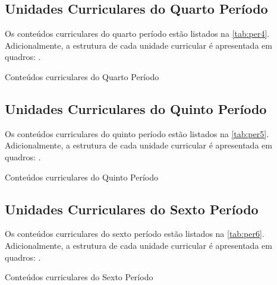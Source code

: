 \clearpage

\subsection{Unidades Curriculares do Quarto Período}

Os conteúdos curriculares do quarto período estão listados na \autoref{tab:per4}. Adicionalmente, a estrutura de cada unidade curricular é apresentada em quadros: .

\begin{table}[!htb]
	\centering\footnotesize
	\caption{Conteúdos curriculares do Quarto Período}
	\label{tab:per4}
\end{table}

\clearpage

\subsection{Unidades Curriculares do Quinto Período}

Os conteúdos curriculares do quinto período estão listados na \autoref{tab:per5}. Adicionalmente, a estrutura de cada unidade curricular é apresentada em quadros: .

\begin{table}[!htb]
	\centering\footnotesize
	\caption{Conteúdos curriculares do Quinto Período}
	\label{tab:per5}
\end{table}

\clearpage

\subsection{Unidades Curriculares do Sexto Período}

Os conteúdos curriculares do sexto período estão listados na \autoref{tab:per6}. Adicionalmente, a estrutura de cada unidade curricular é apresentada em quadros: .

\begin{table}[!htb]
	\centering\footnotesize
	\caption{Conteúdos curriculares do Sexto Período}
	\label{tab:per6}
\end{table}

